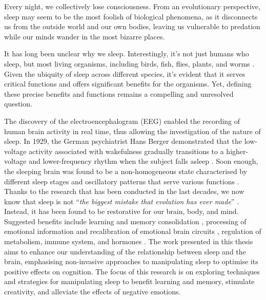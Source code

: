 Every night, we collectively lose consciousness. From an evolutionary perspective, sleep may seem to be the most foolish of biological phenomena, as it disconnects us from the outside world and our own bodies, leaving us vulnerable to predation while our minds wander in the most bizarre places. 

It has long been unclear why we sleep. Interestingly, it’s not just humans who sleep, but most living organisms, including birds, fish, flies, plants, and worms \parencite{siegel_all_2008, zielinski_functions_2016}. Given the ubiquity of sleep across different species, it’s evident that it serves critical functions and offers significant benefits for the organisms. Yet, defining these precise benefits and functions remains a compelling and unresolved question. 

The discovery of the electroencephalogram (EEG) enabled the recording of human brain activity in real time, thus allowing the investigation of the nature of sleep. In 1929, the German psychiatrist Hans Berger demonstrated that the low-voltage activity associated with wakefulness gradually transitions to a higher-voltage and lower-frequency rhythm when the subject falls asleep \parencite{datta_activation_2008}. Soon enough, the sleeping brain was found to be a non-homogeneous state characterised by different sleep stages and oscillatory patterns that serve various functions \parencite{siegel_all_2008, zielinski_functions_2016}. Thanks to the research that has been conducted in the last decades, we now know that sleep is not “\textit{the biggest mistake that evolution has ever made}” \parencite{mignot_why_2008}. Instead, it has been found to be restorative for our brain, body, and mind. Suggested benefits include learning and memory consolidation \parencite{diekelmann_memory_2010,rasch_about_2013}, processing of emotional information and recalibration of emotional brain circuits \parencite{helm_overnight_2010, walker_role_2009}, regulation of metabolism, immune system, and hormones \parencite{mignot_why_2008,zielinski_functions_2016}.
The work presented in this thesis aims to enhance our understanding of the relationship between sleep and the brain, emphasising non-invasive approaches to manipulating sleep to optimise its positive effects on cognition. The focus of this research is on exploring techniques and strategies for manipulating sleep to benefit learning and memory, stimulate creativity, and alleviate the effects of negative emotions. 

